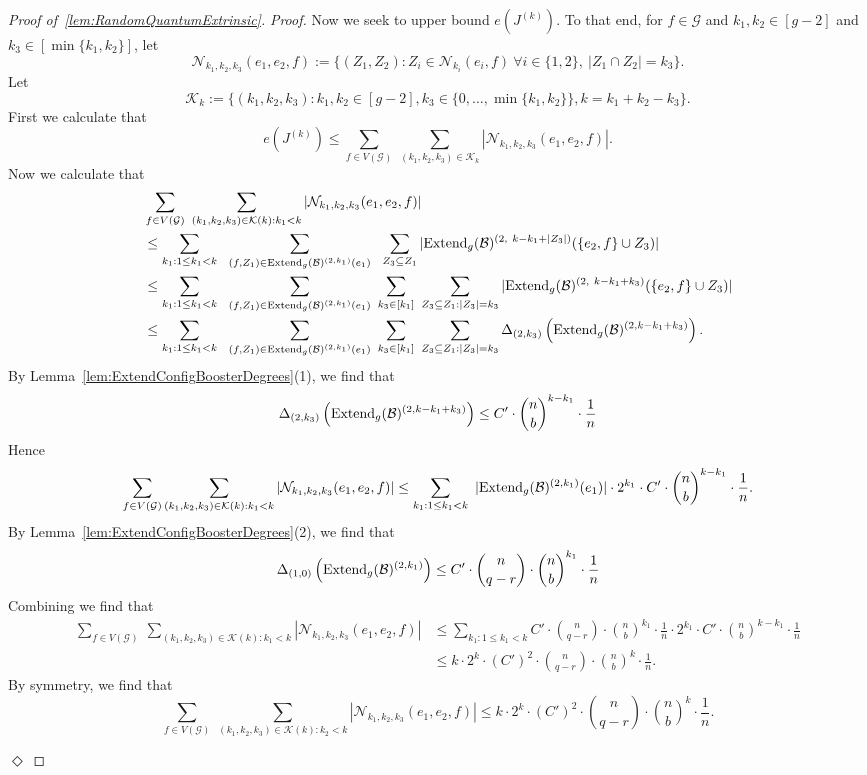 \documentclass[11pt]{article}
\newcommand{\mc}[1]{\mathcal{#1}}
\newcounter{i}
\theoremstyle{plain}
\newenvironment{proofclaim}[1][]%
{\noindent \emph{Proof.} {}{#1}{}}{\hfill
	$\Diamond$\vspace{1em}}
\renewcommand{\theclaim}{\thetheorem.\arabic{claim}}
\newenvironment{lateproof}[1]
 {%
  \renewcommand{\theclaim}{\ref{#1}.\arabic{claim}}%
  \begin{proof}[Proof of~\cref{#1}]%
 }
 {\end{proof}}
\theoremstyle{plain} %
\theoremstyle{definition}
\begin{document}
\begin{lateproof}{lem:RandomQuantumExtrinsic}
\begin{proofclaim}
Now we seek to upper bound $e(J^{(k)})$. To that end, for $f\in \mc{G}$ and $k_1,k_2\in [g-2]$ and $k_3\in [\min\{k_1,k_2\}]$, let
$$\mc{N}_{k_1,k_2,k_3}(e_1,e_2,f):= \{(Z_1,Z_2): Z_i\in \mc{N}_{k_i}(e_i,f)~\forall i\in\{1,2\},~|Z_1\cap Z_2|=k_3\}.$$
Let 
$$\mc{K}_k := \{(k_1,k_2,k_3): k_1,k_2\in [g-2], k_3\in \{0,\ldots, \min\{k_1,k_2\} \}, k=k_1+k_2-k_3\}.$$ 
First we calculate that
$$e\left(J^{(k)}\right) \le \sum_{f\in V(\mc{G})}~\sum_{(k_1,k_2,k_3)\in \mc{K}_k} |\mc{N}_{k_1,k_2,k_3}(e_1,e_2,f)|.$$
Now we calculate that
\begin{align*}
&\sum_{f\in V(\mc{G})}~\sum_{(k_1,k_2,k_3)\in \mc{K}(k): k_1 < k} |\mc{N}_{k_1,k_2,k_3}(e_1,e_2,f)| \\
&\le \sum_{k_1: 1\le k_1 < k}~~\sum_{(f,Z_1)\in {\rm Extend}_g(\mc{B})^{(2,k_1)}(e_1)} ~~\sum_{Z_3\subseteq Z_1} |{\rm Extend}_g(\mc{B})^{(2,~k-k_1+|Z_3|)}(\{e_2,f\} \cup Z_3)|\\
&\le \sum_{k_1: 1\le k_1 < k}~~\sum_{(f,Z_1)\in {\rm Extend}_g(\mc{B})^{(2,k_1)}(e_1)} ~\sum_{k_3\in [k_1]}~\sum_{Z_3\subseteq Z_1: |Z_3|=k_3} |{\rm Extend}_g(\mc{B})^{(2,~k-k_1+k_3)}(\{e_2,f\} \cup Z_3)| \\
&\le \sum_{k_1: 1\le k_1 < k}~~\sum_{(f,Z_1)\in {\rm Extend}_g(\mc{B})^{(2,k_1)}(e_1)} ~\sum_{k_3\in [k_1]}~\sum_{Z_3\subseteq Z_1: |Z_3|=k_3} \Delta_{(2,k_3)}\left({\rm Extend}_g(\mc{B})^{(2,k-k_1+k_3)}\right).
\end{align*}
By Lemma~\ref{lem:ExtendConfigBoosterDegrees}(1), we find that 
$$\Delta_{(2,k_3)}\left({\rm Extend}_g(\mc{B})^{(2,k-k_1+k_3)}\right) \le C'\cdot \binom{n}{b}^{k-k_1}\cdot \frac{1}{n} $$
Hence
\begin{align*}
\sum_{f\in V(\mc{G})} \sum_{(k_1,k_2,k_3)\in \mc{K}(k): k_1 < k} |\mc{N}_{k_1,k_2,k_3}(e_1,e_2,f)| \le \sum_{k_1: 1\le k_1 < k}~|{\rm Extend}_g(\mc{B})^{(2,k_1)}(e_1)|\cdot 2^{k_1} \cdot  C'\cdot \binom{n}{b}^{k-k_1}\cdot \frac{1}{n}.
\end{align*}
By Lemma~\ref{lem:ExtendConfigBoosterDegrees}(2), we find that 
$$\Delta_{(1,0)}\left({\rm Extend}_g(\mc{B})^{(2,k_1)}\right) \le C'\cdot \binom{n}{q-r}\cdot \binom{n}{b}^{k_1}\cdot \frac{1}{n} $$
Combining we find that
\begin{align*}
\sum_{f\in V(\mc{G})}~\sum_{(k_1,k_2,k_3)\in \mc{K}(k): k_1 < k} |\mc{N}_{k_1,k_2,k_3}(e_1,e_2,f)| &\le \sum_{k_1: 1\le k_1 < k} C'\cdot \binom{n}{q-r}\cdot \binom{n}{b}^{k_1}\cdot \frac{1}{n}\cdot 2^{k_1} \cdot  C'\cdot \binom{n}{b}^{k-k_1}\cdot \frac{1}{n}\\
&\le k\cdot 2^k \cdot (C')^2 \cdot \binom{n}{q-r}\cdot \binom{n}{b}^k \cdot \frac{1}{n}.
\end{align*}
By symmetry, we find that
$$\sum_{f\in V(\mc{G})}~\sum_{(k_1,k_2,k_3)\in \mc{K}(k): k_2 < k} |\mc{N}_{k_1,k_2,k_3}(e_1,e_2,f)| \le k\cdot 2^k \cdot (C')^2 \cdot \binom{n}{q-r}\cdot \binom{n}{b}^k \cdot \frac{1}{n}.$$


\end{proofclaim}
\end{lateproof}
\end{document}
